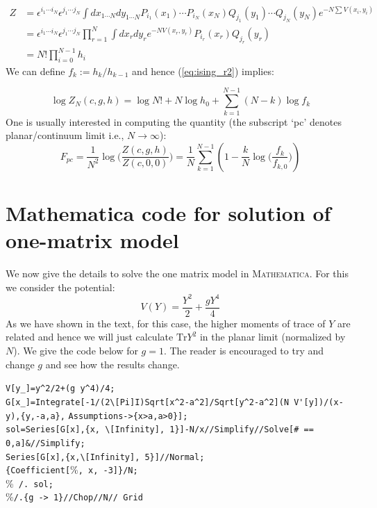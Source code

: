 \documentclass[11pt]{article}
\begin{document}
\begin{align}
	Z &= \epsilon^{i_1 \cdots i_N} \epsilon^{j_1 \cdots j_N} \int dx_{1 \cdots N}
	dy_{1 \cdots N} P_{i_{1}}(x_1) \cdots P_{i_{N}}(x_N)
	Q_{j_{1}}(y_1) \cdots Q_{j_{N}}(y_N)
	e^{-N \sum V(x_i,y_i)} \nonumber  \\  
	&= \epsilon^{i_1 \cdots i_N} \epsilon^{j_1 \cdots j_N} \prod_{r=1}^{N} \int dx_{r} dy_{r} e^{-N V(x_r, y_r)} P_{i_r}(x_r) Q_{j_r}(y_r) \nonumber  \\  
	&=  N! \prod_{i=0}^{N-1} h_{i} 
	\label{eq:ising_r2}
\end{align}
We can define $f_{k} := h_k/h_{k-1}$ and hence 
(\ref{eq:ising_r2}) implies:

\begin{equation}
	\log Z_{N}(c,g,h) = \log N! + N \log h_0 + \sum_{k=1}^{N-1} (N-k) \log f_{k} 
\end{equation}
One is usually interested in computing the quantity (the subscript `pc' denotes planar/continuum limit i.e., $ N \to \infty$):
\begin{equation}
	F_{pc} = \frac{1}{N^2} \log\Bigg( \frac{Z(c,g,h)}{Z(c,0,0)}\Bigg) = \frac{1}{N} \sum_{k=1}^{N-1} \left(1 - \frac{k}{N} \log \Big(\frac{f_k}{f_{k,0}}\Big)\right)
\end{equation}




\section{Mathematica code for solution of one-matrix model}
We now give the details to solve the one matrix model in \textsc{Mathematica}. For this we consider the potential:
\[ V(Y) = \frac{Y^2}{2} + \frac{gY^4}{4} \] 
As we have shown in the text, for this case, the higher moments of trace of $Y$ are related and hence we will just calculate $\mbox{Tr}Y^2$ in the planar limit (normalized by $N$). We give the code below for $g=1$. The reader is encouraged to try and change $g$ and see how the results change.

\begin{mdframed}[backgroundcolor=magenta!3] 
	\begin{footnotesize} 
		\noindent 
		\verb"V[y_]=y^2/2+(g y^4)/4;"\\
		\verb"G[x_]=Integrate[-1/(2\[Pi]I)Sqrt[x^2-a^2]/Sqrt[y^2-a^2](N V'[y])/(x-y),{y,-a,a}," \newline
		\verb"Assumptions->{x>a,a>0}];"\\
		\verb"sol=Series[G[x],{x, \[Infinity], 1}]-N/x//Simplify//Solve[# == 0,a]&//Simplify; "\\
		\verb"Series[G[x],{x,\[Infinity], 5}]//Normal; "\\
		\verb"{Coefficient["\%\verb", x, -3]}/N;"\\
		\%\verb" /. sol;"\\
		\%\verb"/.{g -> 1}//Chop//N// Grid"
	\end{footnotesize} 
\end{mdframed}
\end{document}

